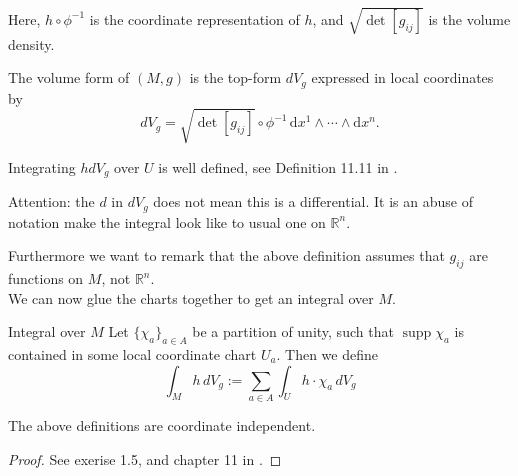 Here, $h\circ\phi^{-1}$ is the coordinate representation of $h$, and $\sqrt{\det[g_{ij}]}$ is the volume density.

The volume form of $(M, g)$ is the top-form $dV_g$ expressed in local coordinates by
$$dV_g = \sqrt{\det[g_{ij}]}\circ\phi^{-1} \, \mathrm{d}x^1 \wedge \cdots \wedge \mathrm{d}x^n.$$

Integrating $hdV_g$ over $U$ is well defined, see Definition 11.11 in \cite{tsakanikas2024dg2}.

Attention: the $d$ in $dV_g$ does not mean this is a differential. It is an abuse of notation make the integral look like to usual one on $\mathbb{R}^n$.

Furthermore we want to remark that the above definition assumes that $g_{ij}$ are functions on $M$, not $\mathbb{R}^n$.
\\

We can now glue the charts together to get an integral over $M$.


\begin{colordef}{Integral over $M$}{}
Let \(\{\chi_a\}_{a \in A}\) be a partition of unity, such that \(\operatorname{supp} \chi_a\) is contained in some local coordinate chart \(U_a\). Then we define
\[
\int_{M} h \, dV_g := \sum_{a \in A} \int_{U} h \cdot \chi_a \, dV_g
\]
\end{colordef}

\begin{colorlem}{}{}
The above definitions are coordinate independent.
\end{colorlem}
\begin{proof}
See exerise 1.5, and chapter 11 in \cite{tsakanikas2024dg2}.
\end{proof}





